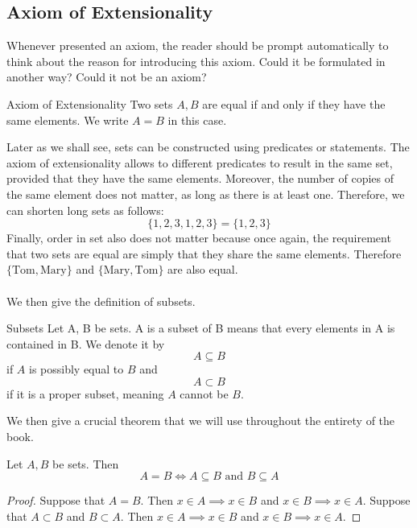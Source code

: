 \documentclass[a4paper]{article}
\begin{document}
\subsection{Axiom of Extensionality}
Whenever presented an axiom, the reader should be prompt automatically to think about the reason for introducing this axiom. Could it be formulated in another way? Could it not be an axiom? 

\begin{axm}{Axiom of Extensionality}{} Two sets $A,B$ are equal if and only if they have the same elements. We write $A=B$ in this case. 
\end{axm}

Later as we shall see, sets can be constructed using predicates or statements. The axiom of extensionality allows to different predicates to result in the same set, provided that they have the same elements. Moreover, the number of copies of the same element does not matter, as long as there is at least one. Therefore, we can shorten long sets as follows: $$\{1,2,3,1,2,3\}=\{1,2,3\}$$ Finally, order in set also does not matter because once again, the requirement that two sets are equal are simply that they share the same elements. Therefore $\{\text{Tom}, \text{Mary}\}$ and $\{\text{Mary}, \text{Tom}\}$ are also equal. \\~\\

We then give the definition of subsets. 

\begin{defn}{Subsets}{} Let A, B be sets. A is a subset of B means that every elements in A is contained in B. We denote it by $$A\subseteq B$$ if $A$ is possibly equal to $B$ and $$A\subset B$$ if it is a proper subset, meaning $A$ cannot be $B$. 
\end{defn}

We then give a crucial theorem that we will use throughout the entirety of the book. 

\begin{thm}{}{} Let $A,B$ be sets. Then $$A=B\iff A\subseteq B\text{ and }B\subseteq A$$\tcbline
\begin{proof} Suppose that $A=B$. Then $x\in A\implies x\in B$ and $x\in B\implies x\in A$. Suppose that $A\subset B$ and $B\subset A$. Then $x\in A\implies x\in B$ and $x\in B\implies x\in A$. 
\end{proof}
\end{thm}
\end{document}
